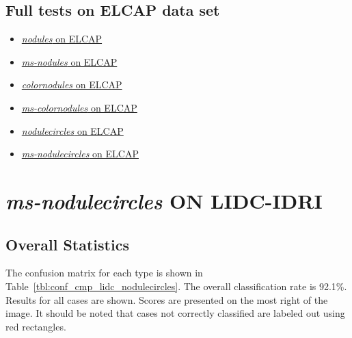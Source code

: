 \documentclass[onecolumn]{IEEEtran}
\begin{document}
\subsection{Full tests on ELCAP data set}
\begin{itemize}
\item \href{http://liu3xing3long.github.io/assets/papers/nodules_elcap.pdf}{\emph{nodules} on ELCAP}

\item \href{http://liu3xing3long.github.io/assets/papers/msnodules_elcap.pdf}{\emph{ms-nodules} on ELCAP}

\item \href{http://liu3xing3long.github.io/assets/papers/colornodules_elcap.pdf}{\emph{colornodules} on ELCAP}

\item \href{http://liu3xing3long.github.io/assets/papers/mscolornodules_elcap.pdf}{\emph{ms-colornodules} on ELCAP}

\item \href{http://liu3xing3long.github.io/assets/papers/nodulecircles_elcap.pdf}{\emph{nodulecircles} on ELCAP}

\item \href{http://liu3xing3long.github.io/assets/papers/msnodulecircles_elcap.pdf}{\emph{ms-nodulecircles} on ELCAP}

\end{itemize}


\newpage
\section{\emph{ms-nodulecircles} ON LIDC-IDRI}
\subsection{Overall Statistics }
The confusion matrix for each type is shown in Table~\ref{tbl:conf_cmp_lidc_nodulecircles}. The overall classification rate is 92.1\%. Results for all cases are shown. Scores are presented on the most right of the image. It should be noted that cases not correctly classified are labeled out using red rectangles.
\end{document}

